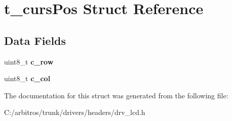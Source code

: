 \hypertarget{structt__curs_pos}{\section{t\-\_\-curs\-Pos Struct Reference}
\label{structt__curs_pos}
}
\subsection*{Data Fields}
\begin{DoxyCompactItemize}
\item 
\hypertarget{structt__curs_pos_a6f99a6b7388142dd31b55ef00a2d9386}{uint8\-\_\-t {\bfseries c\-\_\-row}}\label{structt__curs_pos_a6f99a6b7388142dd31b55ef00a2d9386}

\item 
\hypertarget{structt__curs_pos_aeb304f930f2ea1a47266e1f85883568f}{uint8\-\_\-t {\bfseries c\-\_\-col}}\label{structt__curs_pos_aeb304f930f2ea1a47266e1f85883568f}

\end{DoxyCompactItemize}


The documentation for this struct was generated from the following file\-:\begin{DoxyCompactItemize}
\item 
C\-:/arbitros/trunk/drivers/headers/drv\-\_\-lcd.\-h\end{DoxyCompactItemize}
